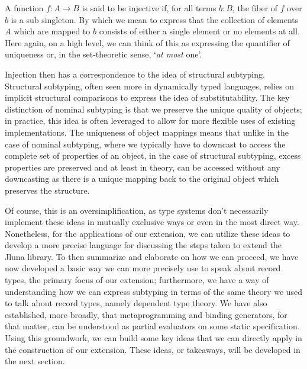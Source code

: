 \begin{definition}
 A function $f : A \rightarrow B$ is said to be injective if, for all terms $b : B$, the fiber of $f$ over $b$ is a sub singleton. By which we mean to express that the collection of elements $A$ which are mapped to $b$ consists of either a single element or no elements at all. Here again, on a high level, we can think of this as expressing the quantifier of uniqueness or, in the set-theoretic sense, `\textit{at most} one'.
  
\end{definition}

Injection then has a correspondence to the idea of structural subtyping. Structural subtyping, often seen more in dynamically typed languages, relies on implicit structural comparisons to express the idea of substitutability. The key distinction of nominal subtyping is that we preserve the unique quality of objects; in practice, this idea is often leveraged to allow for more flexible uses of existing implementations. The uniqueness of object mappings means that unlike in the case of nominal subtyping, where we typically have to downcast to access the complete set of properties of an object, in the case of structural subtyping, excess properties are preserved and at least in theory, can be accessed without any downcasting as there is a unique mapping back to the original object which preserves the structure.

Of course, this is an oversimplification, as type systems don't necessarily implement these ideas in mutually exclusive ways or even in the most direct way. Nonetheless, for the applications of our extension, we can utilize these ideas to develop a more precise language for discussing the steps taken to extend the Jluna library. To then summarize and elaborate on how we can proceed, we have now developed a basic way we can more precisely use to speak about record types, the primary focus of our extension; furthermore, we have a way of understanding how we can express subtyping in terms of the same theory we used to talk about record types, namely dependent type theory. We have also established, more broadly, that metaprogramming and binding generators, for that matter, can be understood as partial evaluators on some static specification. Using this groundwork, we can build some key ideas that we can directly apply in the construction of our extension. These ideas, or takeaways, will be developed in the next section.

